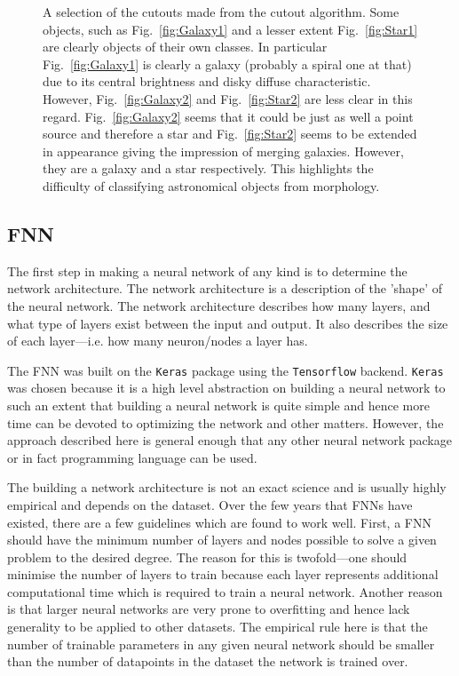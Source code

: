\documentclass[a4paper,fleqn,usenatbib]{mnras}
\begin{document}
\begin{figure}
 \caption{A selection of the cutouts made from the cutout algorithm. Some objects, such as Fig.~\ref{fig:Galaxy1} and a lesser extent Fig.~\ref{fig:Star1} are clearly objects of their own classes. In particular Fig.~\ref{fig:Galaxy1} is clearly a galaxy (probably a spiral one at that) due to its central brightness and disky diffuse characteristic. However, Fig.~\ref{fig:Galaxy2} and Fig.~\ref{fig:Star2} are less clear in this regard. Fig.~\ref{fig:Galaxy2} seems that it could be just as well a point source and therefore a star and Fig.~\ref{fig:Star2} seems to be extended in appearance giving the impression of merging galaxies. However, they are a galaxy and a star respectively. This highlights the difficulty of classifying astronomical objects from morphology.}
 \label{fig:Examples}
 \end{figure}
 
\subsection{FNN}
The first step in making a neural network of any kind is to determine the network architecture. The network architecture is a description of the 'shape' of the neural network. The network architecture describes how many layers, and what type of layers exist between the input and output. It also describes the size of each layer---i.e. how many neuron/nodes a layer has. 

The FNN was built on the \texttt{Keras} package using the \texttt{Tensorflow} backend. \texttt{Keras} was chosen because it is a high level abstraction on building a neural network to such an extent that building a neural network is quite simple and hence more time can be devoted to optimizing the network and other matters. However, the approach described here is general enough that any other neural network package or in fact programming language can be used. 

The building a network architecture is not an exact science and is usually highly empirical and depends on the dataset. Over the few years that FNNs have existed, there are a few guidelines which are found to work well. First, a FNN should have the minimum number of layers and nodes possible to solve a given problem to the desired degree. The reason for this is twofold---one should minimise the number of layers to train because each layer represents additional computational time which is required to train a neural network. Another reason is that larger neural networks are very prone to overfitting and hence lack generality to be applied to other datasets. The empirical rule here is that the number of trainable parameters in any given neural network should be smaller than the number of datapoints in the dataset the network is trained over. 
\end{document}
